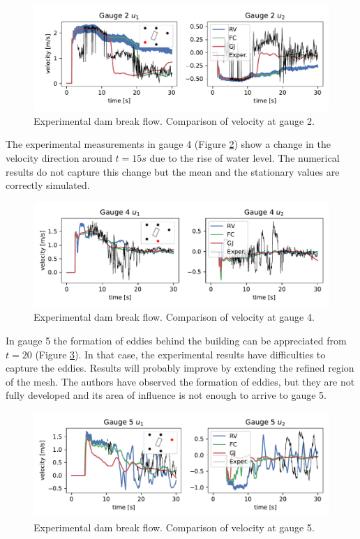 \begin{figure}
\centering
\includegraphics[width=\textwidth]{img/eulerian/exp/gauge2_vel.pdf}
\caption{Experimental dam break flow. Comparison of velocity at gauge 2.}
\label{experiment_gauge2_vel}
\end{figure}

The experimental measurements in gauge 4 (Figure \ref{experiment_gauge4_vel}) show a change in the velocity direction around $t=15s$ due to the rise of water level. The numerical results do not capture this change but the mean and the stationary values are correctly simulated.

\begin{figure}
\centering
\includegraphics[width=\textwidth]{img/eulerian/exp/gauge4_vel.pdf}
\caption{Experimental dam break flow. Comparison of velocity at gauge 4.}
\label{experiment_gauge4_vel}
\end{figure}

In gauge 5 the formation of eddies behind the building can be appreciated from $t=20$ (Figure \ref{experiment_gauge5_vel}). In that case, the experimental results have difficulties to capture the eddies. Results will probably improve by extending the refined region of the mesh. The authors have observed the formation of eddies, but they are not fully developed and its area of influence is not enough to arrive to gauge 5.


\begin{figure}
\centering
\includegraphics[width=\textwidth]{img/eulerian/exp/gauge5_vel.pdf}
\caption{Experimental dam break flow. Comparison of velocity at gauge 5.}
\label{experiment_gauge5_vel}
\end{figure}


